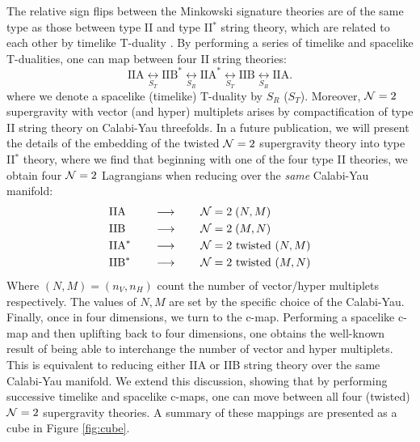 The relative sign flips between the Minkowski signature theories are of the same type as those between type II and type II$^*$ string theory, which are related to each other by timelike T-duality \cite{Hull:1998vg}. By performing a series of timelike and spacelike T-dualities, one can map between four II string theories:
\begin{equation*}
	\text{IIA} \underset{S_T}{\longleftrightarrow} \text{IIB}^* \underset{S_R}{\longleftrightarrow} \text{IIA}^* \underset{S_T}{\longleftrightarrow} \text{IIB} \underset{S_R}{\longleftrightarrow} \text{IIA}.
\end{equation*}
where we denote a spacelike (timelike) T-duality by $S_R$ ($S_T$). Moreover, ${\cal N} = 2$ supergravity with vector (and hyper) multiplets arises by compactification of type II string theory on Calabi-Yau threefolds. In a future publication, we will present the details of the embedding of the twisted ${\cal N}=2$ supergravity theory into type II$^*$ theory, where we find that beginning with one of the four type II theories, we obtain four ${\cal N} = 2$ Lagrangians when reducing over the \textit{same} Calabi-Yau manifold:
\begin{equation*}
\begin{aligned}
	&\text{IIA} \quad &&\longrightarrow \qquad {\cal N} = 2 \; (N, M) \\
	&\text{IIB} \quad &&\longrightarrow \qquad {\cal N} = 2 \; (M, N) \\
	&\text{IIA}^* \quad &&\longrightarrow \qquad {\cal N} = 2 \text{ twisted } (N, M) \\
	&\text{IIB}^* \quad &&\longrightarrow \qquad {\cal N} = 2 \text{ twisted } (M, N)
\end{aligned}
\end{equation*}
Where $(N,M) = (n_V, n_H)$ count the number of vector/hyper multiplets respectively. The values of $N,M$ are set by the specific choice of the Calabi-Yau. Finally, once in four dimensions, we turn to the c-map. Performing a spacelike c-map and then uplifting back to four dimensions, one obtains the well-known result of being able to interchange the number of vector and hyper multiplets. This is equivalent to reducing either IIA or IIB string theory over the same Calabi-Yau manifold. We extend this discussion, showing that by performing successive timelike and spacelike c-maps, one can move between all four (twisted) ${\cal N} = 2$ supergravity theories. A summary of these mappings are presented as a cube in Figure \ref{fig:cube}.

